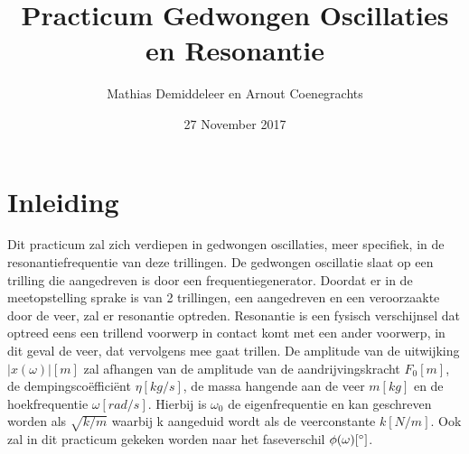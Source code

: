 \documentclass[12pt,a4]{article}
\title{Practicum Gedwongen Oscillaties en Resonantie}
\author{Mathias Demiddeleer en Arnout Coenegrachts}
\date{27 November 2017}
\begin{document}
\maketitle

\section{Inleiding}
Dit practicum zal zich verdiepen in gedwongen oscillaties, meer specifiek, in de resonantiefrequentie van deze trillingen. De gedwongen oscillatie slaat op een trilling die aangedreven is door een frequentiegenerator. Doordat er in de meetopstelling sprake is van 2 trillingen, een aangedreven en een veroorzaakte door de veer, zal er resonantie optreden. Resonantie is een fysisch verschijnsel dat optreed eens een trillend voorwerp in contact komt met een ander voorwerp, in dit geval de veer, dat vervolgens mee gaat trillen. De amplitude van de uitwijking $|x(\omega)|  [m]$ zal afhangen van de amplitude van de aandrijvingskracht $F_0  [m]$, de dempingsco\"effici\"ent $\eta  [kg/s]$, de massa hangende aan de veer $m  [kg]$ en de hoekfrequentie $\omega  [rad/s]$. Hierbij is $\omega_0$ de eigenfrequentie en kan geschreven worden als $\sqrt{k/m}$ waarbij k aangeduid wordt als de veerconstante $k  [N/m]$. Ook zal in dit practicum gekeken worden naar het faseverschil $ \phi(\omega)  [\degree]$.\\ \\
\end{document}
